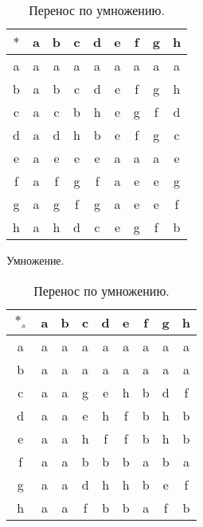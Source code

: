 \documentclass[10pt,a4paper,final]{article} %
\begin{document}
	
	
	\begin{table}[h]
		\centering
		\begin{minipage}{.5\textwidth}
			\centering
			\begin{tabular}{c|cccccccc}
				
				$*$ & a & b & c & d & e & f & g & h \\
				\hline
				a & a & a & a & a & a & a & a & a \\
				b & a & b & c & d & e & f & g & h \\
				c & a & c & b & h & e & g & f & d \\
				d & a & d & h & b & e & f & g & c \\
				e & a & e & e & e & a & a & a & e \\
				f & a & f & g & f & a & e & e & g \\
				g & a & g & f & g & a & e & e & f \\
				h & a & h & d & c & e & g & f & b \\
				
			\end{tabular}
			\caption{Умножение.}
		\end{minipage}%
		\begin{minipage}{.5\textwidth}
			\centering
			\begin{tabular}{c|cccccccc}

				$*_s$ & a & b & c & d & e & f & g & h \\
				\hline
				a & a & a & a & a & a & a & a & a \\
				b & a & a & a & a & a & a & a & a \\
				c & a & a & g & e & h & b & d & f \\
				d & a & a & e & h & f & b & h & b \\
				e & a & a & h & f & f & b & h & b \\
				f & a & a & b & b & b & a & b & a \\
				g & a & a & d & h & h & b & e & f \\
				h & a & a & f & b & b & a & f & b \\
				
			\end{tabular}
			\caption{Перенос по умножению.}
		\end{minipage}
	\end{table}
	
\end{document}
